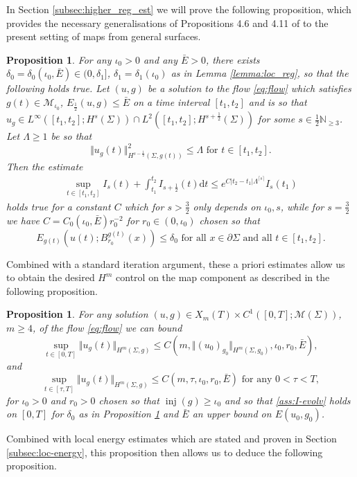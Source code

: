 \documentclass[10pt,reqno]{amsart}
\theoremstyle{plain}
\newtheorem{prop}[lemma]{Proposition}
\theoremstyle{definition}
\numberwithin{equation}{section}
\newcommand{\de}{\delta}
\newcommand{\La}{\Lambda}
\newcommand{\Si}{\Sigma}
\newcommand{\N}{\ensuremath{{\mathbb N}}}
\DeclareMathOperator{\inj}{inj}
\newcommand{\norm}[1]{\Vert#1\Vert}
\newcommand{\half}{\frac{1}{2}}
\newcommand{\dd}{\mathrm{d}} %
\newcommand{\abs}[1]{\vert#1\vert}
\newcommand{\pSi}{{\partial \Sigma}}
\newcommand{\MM}{\mathcal{M}} %
\newcommand{\hf}{\frac{1}{2}} %
\newcommand{\MMiota}{\MM_{\iota_0}}
\begin{document}
In Section \ref{subsec:higher_reg_est} we will prove the following proposition, which provides the necessary generalisations of Propositions 4.6 and 4.11 of \cite{S} to the present setting of maps from general surfaces.

\begin{prop}\label{prop:higher_reg} 
    For any $\iota_0>0$ and any $\bar E >0$, there exists $\de_0=\de_0(\iota_0,\bar E)\in (0,\de_1]$, $\de_1=\de_1(\iota_0)$ as in Lemma \ref{lemma:loc_reg}, so that the following holds true. Let $(u,g)$ be a solution to the flow \eqref{eq:flow} which satisfies $g(t) \in \MMiota$, $E_\hf(u,g)\leq \bar{E}$  on a time interval $[t_1,t_2]$ and is so that $u_g \in L^\infty([t_1,t_2]; H^s(\Si)) \cap L^2([t_1,t_2];H^{s+\hf}(\Si))$ for some $s \in \hf \N_{\geq 3}$. Let $\La\geq 1$ be so that 
	\begin{equation}\label{ass:prop-higher-reg-Lambda}
        \norm{u_g(t)}_{H^{s-\half}(\Si,g(t))}^2\leq \La \text{ for } t\in [t_1,t_2].
	\end{equation}
	Then the estimate 
	\begin{align}\label{est:higher_reg_est}
		\sup\limits_{t \in [t_1,t_2]}I_{s}(t) + \int_{t_1}^{t_2}I_{s+\hf}(t)\dd t \leq e^{C\abs{t_2-t_1}\La^{\lceil s\rceil }} I_{s}(t_1)
        \end{align}
    holds true for a constant $C$ which for $s>\frac32$ only depends on $\iota_0, s$, while for $s=\frac32$ we have $C=C_0(\iota_0,\bar E)r_0^{-2}$ for $r_0\in (0,\iota_0)$ chosen so that
    \begin{equation}\label{ass:I-evolv}
        E_{g(t)}(u(t); B_{r_0}^{g(t)}(x))\leq \de_0 \text{ for all } x\in \pSi \text{ and all } t\in [t_1,t_2].
    \end{equation}  
\end{prop}

Combined with a standard iteration argument, these a priori estimates allow us to obtain the desired $H^m$ control on the map component as described in the following proposition. 

\begin{prop}\label{prop:smooth_existence}
    For any solution $(u,g) \in X_{m}(T)\times C^1([0,T];\MM(\Si))$, $m\geq 4$, of the flow  \eqref{eq:flow} we can bound   
	\begin{equation}\label{est:higher_reg_Hm}
		\sup\limits_{t \in [0,T]} \norm{u_g(t)}_{H^m(\Si,g)}\leq C(m,\norm{(u_0)_{g_0}}_{H^m(\Si,g_0)},\iota_0, r_0,\bar E),
	\end{equation}
    and 
    \begin{equation}\label{est:higher_reg_smoothing}
		\sup\limits_{t \in [\tau,T]} \norm{u_g(t)}_{H^m(\Si,g)}\leq C(m,\tau,\iota_0, r_0, \bar E) \text{ for any } 0<\tau<T, 
	\end{equation}
    for $\iota_0>0$ and $r_0>0$ chosen so that $\inj(g)\geq \iota_0$ and so that \eqref{ass:I-evolv} holds on $[0,T]$ for $\de_0$ as in Proposition \ref{prop:higher_reg} and $\bar E$  an upper bound on $E(u_0,g_0)$.
\end{prop}
Combined with local energy estimates which are stated and proven in Section \ref{subsec:loc-energy}, this proposition then allows us to deduce the following proposition. 
\end{document}
